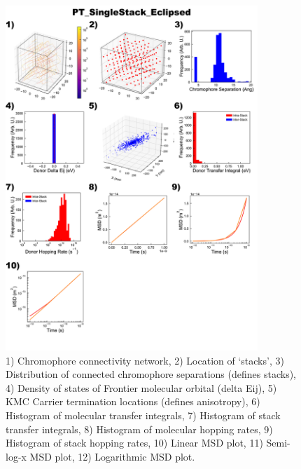 \documentclass[12pt]{article}
\begin{document}
\begin{figure}[h]\centering
	\includegraphics[width=0.85\textwidth]{Figures/PT_SingleStack_Eclipsed.png}
    \caption{   1) Chromophore connectivity network, 
                2) Location of `stacks', 
                3) Distribution of connected chromophore separations (defines stacks),
                4) Density of states of Frontier molecular orbital (delta Eij),
                5) KMC Carrier termination locations (defines anisotropy),
                6) Histogram of molecular transfer integrals,
                7) Histogram of stack transfer integrals,
                8) Histogram of molecular hopping rates,
                9) Histogram of stack hopping rates,
                10) Linear MSD plot,
                11) Semi-log-x MSD plot,
                12) Logarithmic MSD plot.}
	\label{fig:PTSingEcl}
\end{figure}
\end{document}
